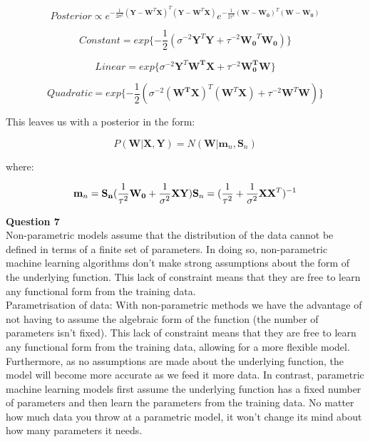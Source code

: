 \documentclass[10pt, a4paper, twocolumn]{article} %
\begin{document}
\begin{enumerate}
   \begin{equation}
      Posterior \propto e^{-\frac{1}{2\sigma^2}(\mathbf{Y}-\mathbf{W}^T\mathbf{X})^T(\mathbf{Y}-\mathbf{W}^T\mathbf{X})}e^{-\frac{1}{2\tau^2}(\mathbf{W}-\mathbf{W_0})^T(\mathbf{W}-\mathbf{W_0})}
  \end{equation}
  
  \begin{equation}
      Constant = exp\{-\frac{1}{2}(\sigma^{-2}\mathbf{Y}^T\mathbf{Y}+\tau^{-2}\mathbf{W_0}^T\mathbf{W_0})\}
  \end{equation}
  
  \begin{equation}
      Linear = exp\{\sigma^{-2}\mathbf{Y}^T\mathbf{W^T}\mathbf{X}+\tau^{-2}\mathbf{W_0^TW}\}
  \end{equation}
  
  \begin{equation}
      Quadratic = exp\{-\frac{1}{2}(\sigma^{-2}\mathbf{({W}^T\mathbf{X})}^T(\mathbf{W}^T\mathbf{X})+\tau^{-2}\mathbf{W}^T\mathbf{W})\}
  \end{equation}
  
  This leaves us with a posterior in the form:
  
  \begin{equation}
      P(\mathbf{W}|\mathbf{X}, \mathbf{Y}) = N(\mathbf{W}| \mathbf{m}_n, \mathbf{S}_n)
  \end{equation}
  
  where:
  
  \begin{equation}
      \mathbf{m}_n = \mathbf{S_n}(\frac{1}{\tau^2}\mathbf{W_0} + \frac{1}{\sigma^2}\mathbf{X}\mathbf{Y})\\
      \mathbf{S}_n = (\frac{1}{\tau^2}+ \frac{1}{\sigma^2}\mathbf{X}\mathbf{X}^T)^{-1}
  \end{equation}
  
  \textbf{Question 7}\\
  Non-parametric models assume that the distribution of the data cannot be defined in terms of a finite set of parameters. In doing so, non-parametric machine learning algorithms don't make strong assumptions about the form of the underlying function. This lack of constraint means that they are free to learn any functional form from the training data.\\
  
  Parametrisation of data:
  With non-parametric methods we have the advantage of not having to assume the algebraic form of the function (the number of parameters isn't fixed). This lack of constraint means that they are free to learn any functional form from the training data, allowing for a more flexible model. Furthermore, as no assumptions are made about the underlying function, the model will become more accurate as we feed it more data. In contrast, parametric machine learning models first assume the underlying function has a fixed number of parameters and then learn the parameters from the training data. No matter how much data you throw at a parametric model, it won't change its mind about how many parameters it needs.\\
  

\end{enumerate}
\end{document}
